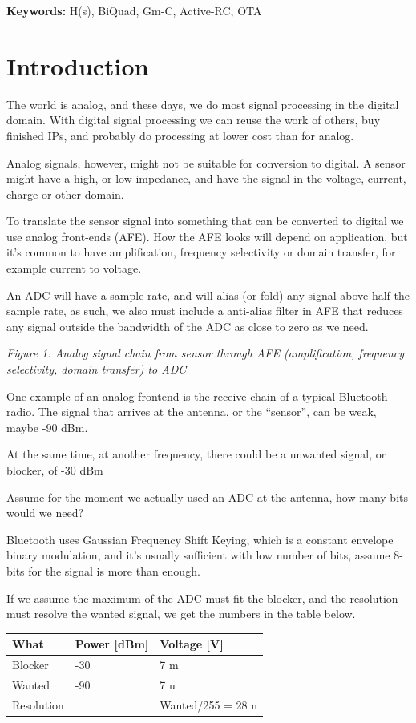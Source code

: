 \textbf{Keywords:} H(s), BiQuad, Gm-C, Active-RC, OTA

\section{Introduction}\label{introduction}

The world is analog, and these days, we do most signal processing in the
digital domain. With digital signal processing we can reuse the work of
others, buy finished IPs, and probably do processing at lower cost than
for analog.

Analog signals, however, might not be suitable for conversion to
digital. A sensor might have a high, or low impedance, and have the
signal in the voltage, current, charge or other domain.

To translate the sensor signal into something that can be converted to
digital we use analog front-ends (AFE). How the AFE looks will depend on
application, but it's common to have amplification, frequency
selectivity or domain transfer, for example current to voltage.

An ADC will have a sample rate, and will alias (or fold) any signal
above half the sample rate, as such, we also must include a anti-alias
filter in AFE that reduces any signal outside the bandwidth of the ADC
as close to zero as we need.


{
\centering
{}
}

\emph{Figure 1: Analog signal chain from sensor through AFE
(amplification, frequency selectivity, domain transfer) to ADC}

One example of an analog frontend is the receive chain of a typical
Bluetooth radio. The signal that arrives at the antenna, or the
``sensor'', can be weak, maybe -90 dBm.

At the same time, at another frequency, there could be a unwanted
signal, or blocker, of -30 dBm

Assume for the moment we actually used an ADC at the antenna, how many
bits would we need?

Bluetooth uses Gaussian Frequency Shift Keying, which is a constant
envelope binary modulation, and it's usually sufficient with low number
of bits, assume 8-bits for the signal is more than enough.

If we assume the maximum of the ADC must fit the blocker, and the
resolution must resolve the wanted signal, we get the numbers in the
table below.

\begin{longtable}[]{@{}lll@{}}
\toprule\noalign{}
What & Power {[}dBm{]} & Voltage {[}V{]} \\
\midrule\noalign{}
\endhead
\bottomrule\noalign{}
\endlastfoot
Blocker & -30 & 7 m \\
Wanted & -90 & 7 u \\
Resolution & & Wanted/255 = 28 n \\
\end{longtable}

